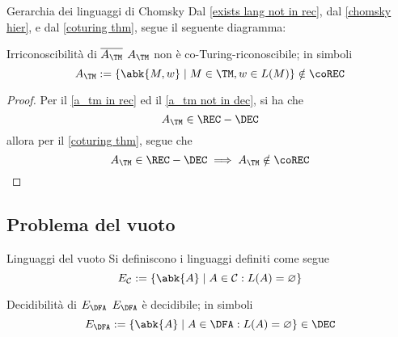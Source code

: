 \documentclass[a4paper, 12pt]{report}
\begin{document}
    \begin{framedobs}{Gerarchia dei linguaggi di Chomsky}
        Dal \cref{exists lang not in rec}, dal \cref{chomsky hier}, e dal \cref{coturing thm}, segue il seguente diagramma:

        \begin{center}
        \end{center}
    \end{framedobs}

    \begin{framedcor}[label={a_tm not in corec}]{Irriconoscibilità di $\overline{A_\TM}$}
        $A_\TM$ non è co-Turing-riconoscibile; in simboli $$A_\TM := \{\abk{M, w} \mid M \in \TM, w \in L(M)\} \notin \coREC$$
    \end{framedcor}

    \begin{proof}
        Per il \cref{a_tm in rec} ed il \cref{a_tm not in dec}, si ha che $$A_\TM \in \REC - \DEC$$ allora per il \cref{coturing thm}, segue che $$A_\TM \in \REC - \DEC \implies A_\TM \notin \coREC$$
    \end{proof}

    \subsection{Problema del vuoto}

    \begin{frameddefn}{Linguaggi del vuoto}
        Si definiscono  i linguaggi definiti come segue $$E_\mathcal{C} := \{\abk{A} \mid A \in \mathcal{C}: L(A) = \varnothing\}$$
    \end{frameddefn}

    \begin{framedthm}[label={dec e_dfa}]{Decidibilità di $E_\DFA$}
        $E_\DFA$ è decidibile; in simboli $$E_\DFA := \{\abk{A} \mid A \in \DFA: L(A) = \varnothing \} \in \DEC$$
    \end{framedthm}
\end{document}
